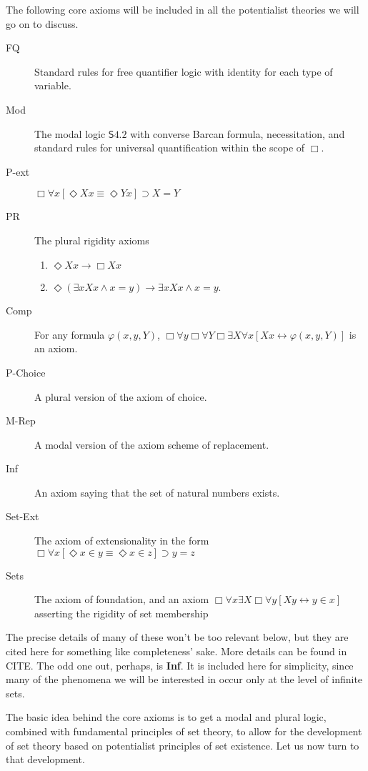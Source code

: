 \documentclass{article}
\begin{document}
The following core axioms will be included in all the potentialist theories we 
will go on to discuss.
\begin{description}
    \item[FQ] Standard rules for free quantifier logic 
    with identity for each type of variable.
    \item[Mod] The modal logic $\mathsf{S4.2}$ with converse Barcan formula,
    necessitation, and standard rules for universal quantification within the scope of $\Box$.  
    \item[P-ext] $\Box \forall x [\Diamond Xx \equiv \Diamond Yx] \supset X = Y$
    \item[PR] The plural rigidity axioms 
    \begin{enumerate} 
        \item $ \Diamond Xx \rightarrow \Box Xx$ 
        \item $ \Diamond (\exists x Xx \wedge x = y) \rightarrow \exists x Xx \wedge x = y$.
    \end{enumerate}
    \item[Comp] For any formula $\varphi(x, y, Y)$, 
    $\Box \forall y \Box \forall Y \Box \exists X \forall x [Xx \leftrightarrow \varphi(x, y, Y)]$ is an axiom.
    \item[P-Choice] A plural version of the axiom of choice.
    \item[M-Rep] A modal version of the axiom scheme of replacement.
    \item[Inf] An axiom saying that the set of natural numbers exists.
    \item[Set-Ext] The axiom of extensionality in the form 
    $\Box \forall x [\Diamond x \in y \equiv \Diamond x \in z] \supset y = z $
    \item[Sets] The axiom of foundation, and an axiom 
      $\Box \forall x \exists X \Box \forall y[Xy \leftrightarrow y \in x]$ asserting the rigidity of set membership
\end{description}
The precise details of many of these won't be too relevant below, but they are cited 
here for something like completeness' sake. More details can be found in CITE. The 
odd one out, perhaps, is {\bf Inf}. It is included here for simplicity, since 
many of the 
phenomena we will be interested in occur only at the level of infinite sets.

The basic 
idea behind the core axioms is to get a modal and plural logic, combined with fundamental 
principles of set theory, to allow for the development of set theory based on potentialist 
principles of set existence. Let us now turn to that development.
\end{document}
